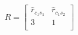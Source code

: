 $$
R=\begin{bmatrix}
    \hat{r}_{c_{1}s_{1}} & \hat{r}_{c_{1}s_{2}} \\
    3 & 1 \\
\end{bmatrix}
$$\\


